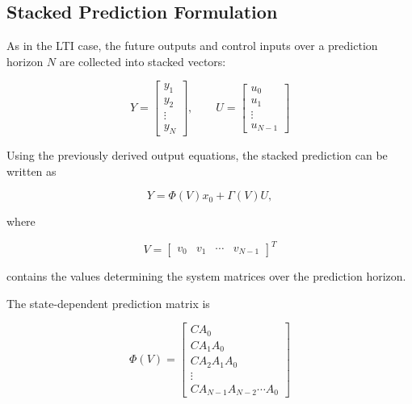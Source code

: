 \subsection{Stacked Prediction Formulation}

As in the LTI case, the future outputs and control inputs over a prediction horizon \(N\) are collected into stacked vectors:

\begin{equation}
    Y =
    \begin{bmatrix}
        y_1 \\
        y_2 \\
        \vdots \\
        y_N
    \end{bmatrix},
    \qquad
    U =
    \begin{bmatrix}
        u_0 \\
        u_1 \\
        \vdots \\
        u_{N-1}
    \end{bmatrix}
\end{equation}

Using the previously derived output equations, the stacked prediction can be written as

\begin{equation}
    Y
    =
    \Phi(V)x_0
    +
    \Gamma(V)U,
    \label{eq:bilinear_stacked}
\end{equation}

where

\begin{equation}
    V =
    \begin{bmatrix}
        v_0 &
        v_1 &
        \cdots &
        v_{N-1}
    \end{bmatrix}^{T}
\end{equation}

contains the values determining the system matrices over the prediction horizon.

The state-dependent prediction matrix is

\begin{equation}
    \Phi(V)
    =
    \begin{bmatrix}
        CA_0 \\
        CA_1A_0 \\
        CA_2A_1A_0 \\
        \vdots \\
        CA_{N-1}A_{N-2}\cdots A_0
    \end{bmatrix}
    \label{eq:bilinear_phi}
\end{equation}

